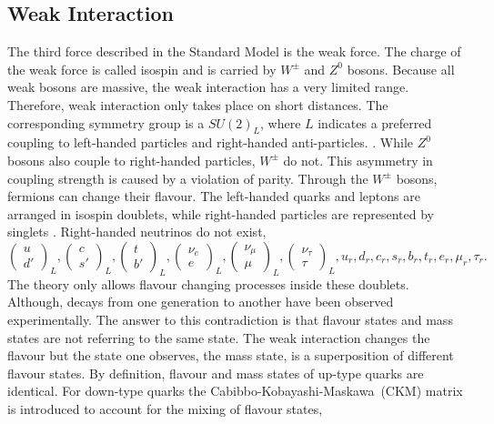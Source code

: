 	\subsection{Weak Interaction}
	The third force described in the Standard Model is the weak force. The charge of the weak force is called isospin and is carried by $W^\pm$ and $Z^0$ bosons. Because all weak bosons are massive, the weak interaction has a very limited range. Therefore, weak interaction only takes place on short distances. The corresponding symmetry group is a $SU(2)_L$, where $L$ indicates a preferred coupling to left-handed particles and right-handed anti-particles. . While $Z^0$ bosons also couple to right-handed particles, $W^\pm$ do not. This asymmetry in coupling strength is caused by a violation of parity. Through the $W^\pm$ bosons, fermions can change their flavour. The left-handed quarks and leptons are arranged in isospin doublets, while right-handed particles are represented by singlets \cite{EW}. Right-handed neutrinos do not exist,
	\begin{equation}
	\begin{pmatrix}	u \\ d'	\end{pmatrix}_L,
	\begin{pmatrix}	c \\ s'	\end{pmatrix}_L,
	\begin{pmatrix}	t \\ b'	\end{pmatrix}_L,
	\begin{pmatrix}	\nu_e \\ e	\end{pmatrix}_L,
	\begin{pmatrix}	\nu_\mu \\ \mu	\end{pmatrix}_L,
	\begin{pmatrix}	\nu_\tau \\ \tau	\end{pmatrix}_L,
	u_r, d_r, c_r, s_r, b_r, t_r, e_r, \mu_r, \tau_r.
	\end{equation}
	The theory only allows flavour changing processes inside these doublets. Although, decays from one generation to another have been observed experimentally. The answer to this contradiction is that flavour states and mass states are not referring to the same state. The weak interaction changes the flavour but the state one observes, the mass state, is a superposition of different flavour states. By definition, flavour and mass states of up-type quarks are identical. For down-type quarks the Cabibbo-Kobayashi-Maskawa~(CKM) matrix \cite{CKM} is introduced to account for the mixing of flavour states,
